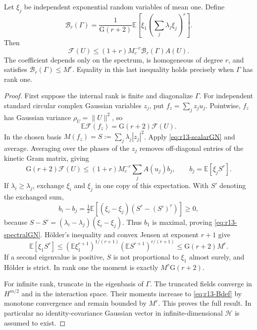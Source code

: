 \begin{theorem}
\label{thm:r13-Gaussian}
Let $\xi_j$ be independent exponential random variables of mean one.
Define
\begin{equation}\label{eq:r13-Bdef}
 \mathcal B_r(\Gamma)=\frac{1}{\mathrm G(r+2)}
   \mathbb E\left[\xi_1\left(\sum_j\lambda_j\xi_j\right)^r\right].
\end{equation}
Then
\begin{equation}\label{eq:r13-spectralGN}
 \mathcal F(U)\le(1+r)M_c^{-r}\mathcal B_r(\Gamma)A(U).
\end{equation}
The coefficient depends only on the spectrum, is homogeneous of degree
$r$, and satisfies $\mathcal B_r(\Gamma)\le M^r$. Equality in this last
inequality holds precisely when $\Gamma$ has rank one.
\end{theorem}
\begin{proof}
First suppose the internal rank is finite and diagonalize $\Gamma$.
For independent standard circular complex Gaussian variables $z_j$, put
$f_z=\sum_jz_ju_j$. Pointwise, $f_z$ has Gaussian variance
$\rho_U=\|U\|^2$, so
\[
 \mathbb E\mathcal F(f_z)=\mathrm G(r+2)\mathcal F(U).
\]
In the chosen basis $M(f_z)=S:=\sum_j\lambda_j|z_j|^2$.
Apply \eqref{eq:r13-scalarGN} and average. Averaging over the phases
of the $z_j$ removes off-diagonal entries of the kinetic Gram matrix,
giving
\begin{equation}\label{eq:r13-weightedGaussian}
 \mathrm G(r+2)\mathcal F(U)
 \le(1+r)M_c^{-r}\sum_j A(u_j)b_j,
 \qquad b_j=\mathbb E[\xi_j S^r].
\end{equation}
If $\lambda_i\ge\lambda_j$, exchange $\xi_i$ and $\xi_j$ in one
copy of this expectation. With $S'$ denoting the exchanged sum,
\[
 b_i-b_j=\tfrac12\mathbb E[(\xi_i-\xi_j)(S^r-(S')^r)]\ge0,
\]
because $S-S'=(\lambda_i-\lambda_j)(\xi_i-\xi_j)$.
Thus $b_1$ is maximal, proving \eqref{eq:r13-spectralGN}.
H\"older's inequality and convex Jensen at exponent $r+1$ give
\[
 \mathbb E[\xi_1S^r]
 \le(\mathbb E\xi_1^{r+1})^{1/(r+1)}
       (\mathbb ES^{r+1})^{r/(r+1)}
 \le\mathrm G(r+2)M^r.
\]
If a second eigenvalue is positive, $S$ is not proportional to $\xi_1$
almost surely, and H\"older is strict. In rank one the moment is
exactly $M^r\mathrm G(r+2)$.

For infinite rank, truncate in the eigenbasis of $\Gamma$.
The truncated fields converge in $H^{m/2}$ and in the interaction
space. Their moments increase to \eqref{eq:r13-Bdef} by monotone
convergence and remain bounded by $M^r$. This proves the full result.
In particular no identity-covariance Gaussian vector in infinite-dimensional
$\mathcal H$ is assumed to exist.
\end{proof}

